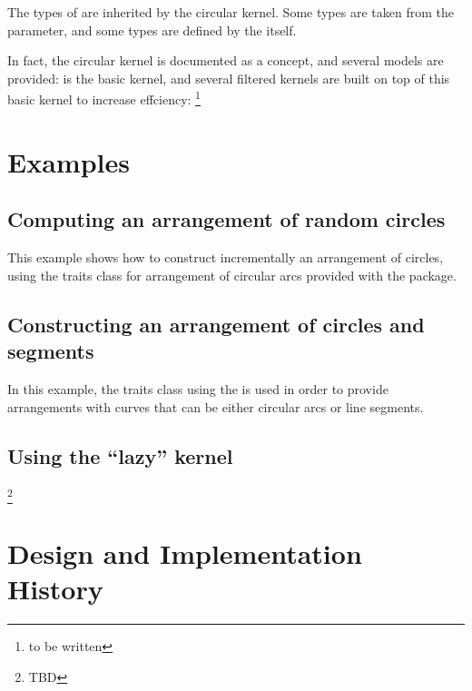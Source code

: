 The types of  are inherited by the circular kernel.
Some types are taken from the  parameter, and
some types are defined by the  itself.

In fact, the circular kernel is documented as a concept, and several
models are provided:  is the basic kernel, and
several filtered kernels are built on top of this basic kernel to
increase effciency: \footnote{to be written}

\section{Examples}

	\subsection{Computing an arrangement of random circles} 

This example shows how to construct incrementally an arrangement of
circles, using the traits class for arrangement of circular arcs
provided with the package.


	\subsection{Constructing an arrangement of circles and segments} 

In this example, the traits class using the
is used in order to provide arrangements with curves that can be
either circular arcs or line segments.


	\subsection{Using the ``lazy'' kernel} 
\footnote{TBD}

\section{Design and Implementation History}
